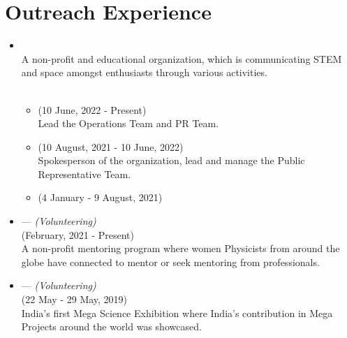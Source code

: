 \documentclass{My_CV}
\begin{document}
\begin{paracol}{2}
\begin{rightcolumn}
\begin{itemize}
\end{itemize}



\section{{\faGroup} Outreach Experience}

\begin{itemize}
    \item {} \\
    A non-profit and educational organization, which is communicating STEM and space amongst enthusiasts through various activities. \\
     \\
    
    \begin{itemize}
    
        \item {} \hfill{(10 June, 2022 - Present)} \\
         Lead the Operations Team and PR Team.
        
        \item {} \hfill{(10 August, 2021 - 10 June, 2022)} \\
         Spokesperson of the organization, lead and manage the Public Representative Team.
        
        \item {} \hfill{(4 January - 9 August, 2021)}

    \end{itemize}
    
    \item {} — \textit{(Volunteering)} \\
     \hfill{(February, 2021 - Present)} \\
    A non-profit mentoring program where women Physicists from around the globe have connected to mentor or seek mentoring from professionals.
    
    \item {} — \textit{(Volunteering)} \\
     \hfill{(22 May - 29 May, 2019)} \\
    India’s first Mega Science Exhibition where India’s contribution in Mega Projects around the world was showcased. \\
     \\
    

\end{itemize}
\end{rightcolumn}
\end{paracol}
\end{document}
